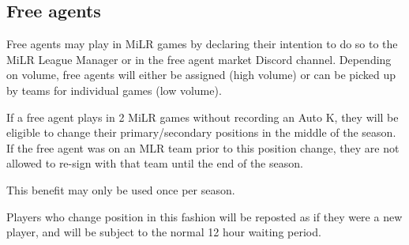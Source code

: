 \subsection{Free agents}
\begin{deepEnumerate}
    \item Free agents may play in MiLR games by declaring their intention to do so 
    to the MiLR League Manager or in the free agent market Discord channel. 
    Depending on volume, free agents will either be assigned (high volume) 
    or can be picked up by teams for individual games (low volume).
    \item If a free agent plays in 2 MiLR games without recording an Auto K, 
    they will be eligible to change their primary/secondary positions in the middle of the season. 
    If the free agent was on an MLR team prior to this position change, 
    they are not allowed to re-sign with that team until the end of the season.
    \begin{deepEnumerate}
        \item This benefit may only be used once per season.
        \item Players who change position in this fashion will be reposted as if they were a new player, 
        and will be subject to the normal 12 hour waiting period.        
    \end{deepEnumerate}
\end{deepEnumerate}
